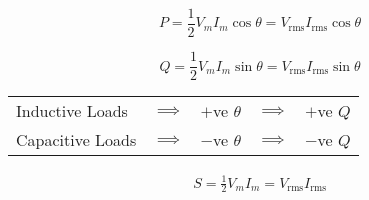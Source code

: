 \begin{multicols}{2}
{        %


        \begin{equation*}
            P = \frac{1}{2} V_m I_m \cos{\theta} = V_{\text{rms}} I_{\text{rms}} \cos{\theta}
        \end{equation*}

        \begin{equation*}
            Q = \frac{1}{2} V_m I_m \sin{\theta} = V_{\text{rms}} I_{\text{rms}} \sin{\theta}
        \end{equation*}
        {\scriptsize%
        \begin{tabular}{lcccc}
            Inductive Loads
                & $\implies$
                & $+$ve $\theta$
                & $\implies$
                & $+$ve $Q$
                \\
            Capacitive Loads
                & $\implies$
                & $-$ve $\theta$
                & $\implies$
                & $-$ve $Q$
                \\
        \end{tabular}
        }

        \CheatsheetEntryExtraSeparation

        \begin{align*}
            S = \frac{1}{2} V_m I_m = V_{\text{rms}} I_{\text{rms}}
        \end{align*}

    }

\end{multicols}
